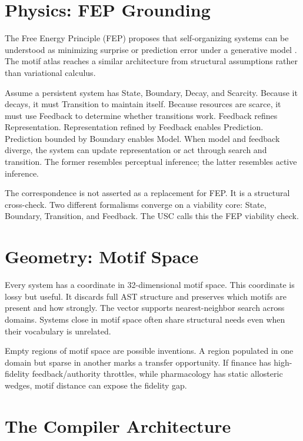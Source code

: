 \documentclass[11pt]{article}
\begin{document}
\section{Physics: FEP Grounding}

The Free Energy Principle (FEP) proposes that self-organizing systems can be
understood as minimizing surprise or prediction error under a generative model
\cite{friston2010}. The motif atlas reaches a similar architecture from
structural assumptions rather than variational calculus.

Assume a persistent system has State, Boundary, Decay, and Scarcity. Because it
decays, it must Transition to maintain itself. Because resources are scarce, it
must use Feedback to determine whether transitions work. Feedback refines
Representation. Representation refined by Feedback enables Prediction.
Prediction bounded by Boundary enables Model. When model and feedback diverge,
the system can update representation or act through search and transition. The
former resembles perceptual inference; the latter resembles active inference.

The correspondence is not asserted as a replacement for FEP. It is a structural
cross-check. Two different formalisms converge on a viability core: State,
Boundary, Transition, and Feedback. The USC calls this the FEP viability check.

\section{Geometry: Motif Space}

Every system has a coordinate in 32-dimensional motif space. This coordinate is
lossy but useful. It discards full AST structure and preserves which motifs are
present and how strongly. The vector supports nearest-neighbor search across
domains. Systems close in motif space often share structural needs even when
their vocabulary is unrelated.

Empty regions of motif space are possible inventions. A region populated in
one domain but sparse in another marks a transfer opportunity. If finance has
high-fidelity feedback/authority throttles, while pharmacology has static
allosteric wedges, motif distance can expose the fidelity gap.

\section{The Compiler Architecture}
\end{document}
